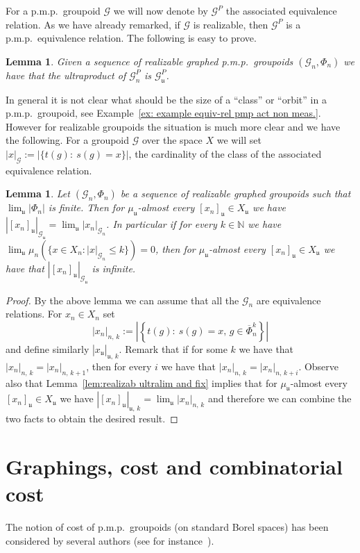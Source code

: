 \documentclass[10pt]{amsart}
\newtheorem{lemm}[cdrthm]{Lemma}
\theoremstyle{definition}
\newcommand{\Nmath}{\mathbb{N}}
\newcommand{\cg}{\mathcal{G}}
\newcommand{\ul}{\mathfrak{u}}
\newcommand{\pmp}{p.m.p.\ }
\begin{document}
For a \pmp groupoid $\cg$ we will now denote by $\cg^P$ the associated equivalence relation. As we have already remarked, if $\cg$ is realizable, then $\cg^P$ is a \pmp equivalence relation. The following is easy to prove.

\begin{lemm}
Given a sequence of realizable graphed \pmp groupoids $(\cg_n, \Phi_n)$ we have that the ultraproduct of $\cg_n^P$ is $\cg_\ul^P$.
\end{lemm}

In general it is not clear what should be the size of a ``class'' or ``orbit'' in a \pmp groupoid, see Example~\ref{ex: example equiv-rel pmp act non meas.}. However for realizable groupoids the situation is much more clear and we have the following. For a groupoid $\cg$ over the space $X$ we will set $|x|_\cg:=|\{t(g):\ s(g)=x\}|$, the cardinality of the class of the associated equivalence relation.

\begin{lemm}\label{lem: ultralim has infinite orbits}
Let $(\cg_n, \Phi_n)$ be a sequence of realizable graphed groupoids such that $\lim_\ul|\Phi_n|$ is finite. Then for $\mu_{\ul}$-almost every $[x_n]_\ul\in X_\ul$ we have $|[x_n]_\ul|_{\cg_\ul}=\lim_\ul |x_n|_{\cg_n}$. In particular if for every $k\in \Nmath$ we have $\lim_\ul\mu_{n}(\{x\in X_n: \vert x \vert_{\cg_n} \leq k\})= 0$, then for $\mu_{\ul}$-almost every $[x_n]_\ul\in X_\ul$ we have that $|[x_n]_\ul|_{\cg_\ul}$ is infinite.
\end{lemm}
\begin{proof}
By the above lemma we can assume that all the $\cg_n$ are equivalence relations. For $x_n\in X_n$ set
\[
|x_n|_{n,\,k}:=\left| \left\{t(g):\ s(g)=x,\, g\in \overline \Phi_n^k\right\}\right|
\]
and define similarly $|x_\ul|_{\ul,\,k}$. Remark that if for some $k$ we have that $|x_n|_{n,\,k}=|x_n|_{n,\,k+1}$, then for every $i$ we have that $|x_n|_{n,\,k}=|x_n|_{n,\,k+i}$. Observe also that Lemma~\ref{lem:realizab ultralim and fix} implies that for $\mu_{\ul}$-almost every $[x_n]_\ul\in X_\ul$ we have $|[x_n]_\ul|_{\ul,\,k}=\lim_\ul |x_n|_{n,\,k}$ and therefore we can combine the two facts to obtain the desired result.
\end{proof}
\pagebreak
\section{Graphings, cost and combinatorial cost}\label{sect: cost and comb cost}

The notion of cost of \pmp groupoids (on standard Borel spaces) has been considered by several authors (see for instance~\cite{Abert-Nikolov-12,Carderi-Master-thesis-2011,Takimoto-cost-L2-2005,Ueda-cost-2006}).
\end{document}
